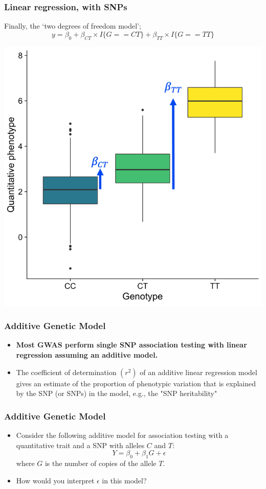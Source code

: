 \documentclass{beamer}
\begin{document}
\begin{frame}
	\frametitle{\bf Linear regression, with SNPs}
	Finally, the `two degrees of freedom model';
	\[
	y = \beta_0 + \beta_{CT}\times I\{G== CT\} + \beta_{TT}\times I\{G== TT\}
	\]
	
	\centerline{
	\includegraphics[scale=.3]{Figures/lm_cat.png}	}
	
\end{frame}


\begin{frame}
	\frametitle{\bf Additive Genetic Model}
	\begin{itemize}
				\item {\bf Most GWAS perform single SNP association testing with linear regression assuming an additive model. }
		\item The coefficient of determination $(r^2)$ of an additive linear regression model  gives an estimate of the proportion of phenotypic variation that is explained by the SNP (or SNPs) in the model, e.g., the "SNP heritability" 
	\end{itemize}
\end{frame}


\begin{frame}
	\frametitle{\bf Additive Genetic Model}
	\begin{itemize}
		\item Consider the following additive model for  association testing with a quantitative trait and a SNP with alleles $C$ and $T$: 
		\[ Y=\beta_{0} + \beta_{1}G + \epsilon \]
		where $G$ is the number of copies of the allele $T$.
		\item How would you interpret $\epsilon$ in this  model?
	\end{itemize}
\end{frame}
\end{document}
